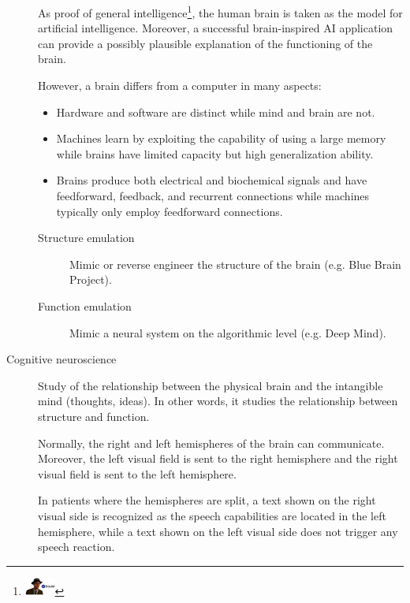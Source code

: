 \begin{description}
        As proof of general intelligence\footnote{\includegraphics[width=1cm]{img/doubt.png}}, 
        the human brain is taken as the model for artificial intelligence.
        Moreover, a successful brain-inspired AI application can 
        provide a possibly plausible explanation of the functioning of the brain.
        
        However, a brain differs from a computer in many aspects:
        \begin{itemize}
            \item Hardware and software are distinct while mind and brain are not.
            \item Machines learn by exploiting the capability of using a large memory
                while brains have limited capacity but high generalization ability.
            \item Brains produce both electrical and biochemical signals and 
                have feedforward, feedback, and recurrent connections
                while machines typically only employ feedforward connections.
        \end{itemize}

        \begin{description}
            \item[Structure emulation] 
                Mimic or reverse engineer the structure of the brain (e.g. Blue Brain Project).

            \item[Function emulation] 
                Mimic a neural system on the algorithmic level (e.g. Deep Mind).
        \end{description}


    \item[Cognitive neuroscience] 
        Study of the relationship between the physical brain and the intangible mind (thoughts, ideas).
        In other words, it studies the relationship between structure and function.

        \begin{example}[Severed Corpus Callosum\footnote{\url{https://www.youtube.com/watch?v=lfGwsAdS9Dc}}]
            Normally, the right and left hemispheres of the brain can communicate. 
            Moreover, the left visual field is sent to the right hemisphere and 
            the right visual field is sent to the left hemisphere.

            In patients where the hemispheres are split, a text shown on the right visual side is recognized as 
            the speech capabilities are located in the left hemisphere,
            while a text shown on the left visual side does not trigger any speech reaction.
        \end{example}
\end{description}



